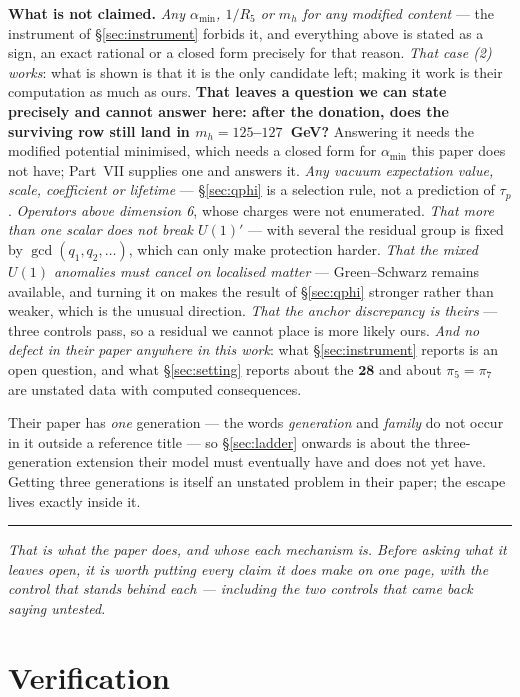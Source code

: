\documentclass[11pt,a4paper]{article}
\newcommand{\rep}[1]{\mathbf{#1}}
\newcommand{\amin}{\alpha_{\min}}
\newcommand{\bridge}[1]{\par\medskip\noindent
  \textcolor{hdrblue!45}{\rule{2.2cm}{0.6pt}}\;\;\parbox[t]{0.84\textwidth}{\small\itshape
  \textcolor{hdrblue!85}{#1}}\par\medskip}
\begin{document}
\textbf{What is not claimed.}
\emph{Any $\amin$, $1/R_5$ or $m_h$ for any modified content} --- the instrument of
\S\ref{sec:instrument} forbids it, and everything above is stated as a sign, an exact rational or a
closed form precisely for that reason. \emph{That case (2) works}: what is shown is that it is the
only candidate left; making it work is their computation as much as ours. \textbf{That leaves a
question we can state precisely and cannot answer here: after the donation, does the surviving
row still land in $m_h=125$--$127$~GeV?} Answering it needs the modified potential minimised, which needs a closed form for $\amin$ this paper does not have; Part~VII \cite{PartVII} supplies one and answers it.
\emph{Any vacuum expectation value, scale, coefficient or lifetime} --- \S\ref{sec:qphi} is a
selection rule, not a prediction of $\tau_p$. \emph{Operators above dimension 6}, whose charges were
not enumerated. \emph{That more than one scalar does not break $U(1)'$} --- with several the
residual group is fixed by $\gcd(q_1,q_2,\dots)$, which can only make protection harder.
\emph{That the mixed $U(1)$ anomalies must cancel on localised matter} --- Green--Schwarz remains
available, and turning it on makes the result of \S\ref{sec:qphi} stronger rather than weaker, which
is the unusual direction. \emph{That the anchor discrepancy is theirs} --- three controls pass, so
a residual we cannot place is more likely ours. \emph{And no defect in their paper anywhere in this
work}: what \S\ref{sec:instrument} reports is an open question, and what \S\ref{sec:setting} reports
about the $\rep{28}$ and about $\pi_5=\pi_7$ are unstated data with computed consequences.

Their paper has \emph{one} generation --- the words \emph{generation} and \emph{family} do not occur
in it outside a reference title --- so \S\ref{sec:ladder} onwards is about the three-generation
extension their model must eventually have and does not yet have. Getting three generations is
itself an unstated problem in their paper; the escape lives exactly inside it.

\bridge{That is what the paper does, and whose each mechanism is. Before asking what it leaves
open, it is worth putting every claim it does make on one page, with the control that stands
behind each --- including the two controls that came back saying \emph{untested}.}

\section{Verification}\label{sec:verif}
\end{document}
